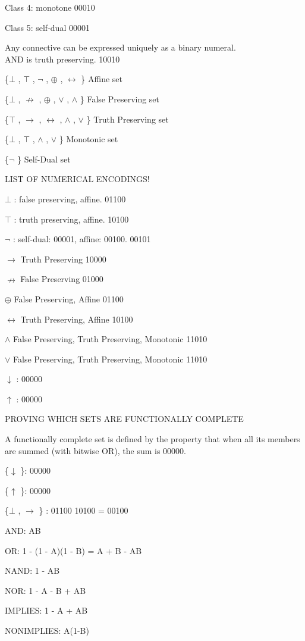 Class 4: monotone 00010

Class 5: self-dual 00001

Any connective can be expressed uniquely as a binary numeral.\\
AND is truth preserving. 10010

\{$\bot$ , $\top$ , $\neg$ , $\oplus$ , $\leftrightarrow$ \} Affine set

\{$\bot$ , $\nrightarrow$ , $\oplus$ , $\lor$ , $\land$ \} False Preserving set

\{$\top$ , $\to$ , $\leftrightarrow$ , $\land$ , $\lor$ \} Truth Preserving set

\{$\bot$ , $\top$ , $\land$ , $\lor$ \} Monotonic set

\{$\neg$ \} Self-Dual set

LIST OF NUMERICAL ENCODINGS!

$\bot$ : false preserving, affine. 01100

$\top$ : truth preserving, affine. 10100

$\neg$ : self-dual: 00001, affine: 00100. 00101

$\to$  Truth Preserving 10000

$\nrightarrow$  False Preserving 01000

$\oplus$  False Preserving, Affine 01100

$\leftrightarrow$  Truth Preserving, Affine 10100

$\land$  False Preserving, Truth Preserving, Monotonic 11010

$\lor$  False Preserving, Truth Preserving, Monotonic 11010

$\downarrow$ : 00000

$\uparrow$ : 00000

PROVING WHICH SETS ARE FUNCTIONALLY COMPLETE

A functionally complete set is defined by the property that when all its
members are summed (with bitwise OR), the sum is 00000.

\{$\downarrow$ \}: 00000

\{$\uparrow$ \}: 00000

\{$\bot$ , $\to$ \} : 01100 \textbar\textbar{} 10100 = 00100

AND: AB

OR: 1 - (1 - A)(1 - B) = A + B - AB

NAND: 1 - AB

NOR: 1 - A - B + AB

IMPLIES: 1 - A + AB

NONIMPLIES: A(1-B)
